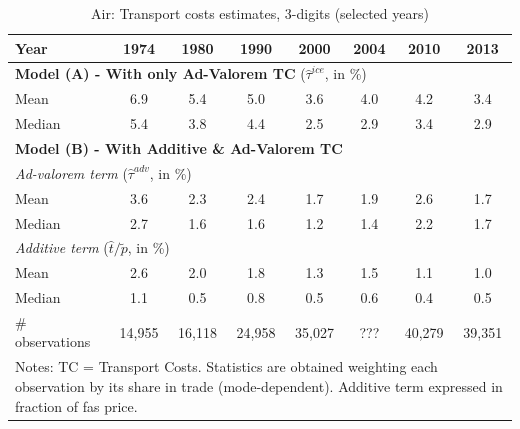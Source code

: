 \documentclass[a4paper,11pt]{article}
\begin{document}
\begin{table}[htbp]
  \centering
  \caption{Air: Transport costs estimates, 3-digits (selected years)}
\begin{center}
    \begin{tabular}{l|ccccccc}
\hline\hline
Year & 1974  & 1980  & 1990  & 2000  & 2004 & 2010  & 2013   \\
\hline
\multicolumn{8}{l}{\textbf{Model (A) - With only Ad-Valorem TC} ($\widehat{\tau}^{ice}$, in \%)}     \\
\hline
Mean  & 6.9& 5.4 &5.0 & 3.6 & 4.0 & 4.2 & 3.4  \\
Median & 5.4 & 3.8 & 4.4 & 2.5 & 2.9 & 3.4 & 2.9  \\
\hline
\multicolumn{8}{l}{\textbf{Model (B) - With Additive \& Ad-Valorem TC}}    \\
\hline
\multicolumn{8}{l}{\textit{Ad-valorem term} ($\widehat{\tau}^{adv}$, in \%)}  \\ \hline
Mean & 3.6 & 2.3 & 2.4 &1.7 & 1.9 & 2.6 & 1.7  \\
Median & 2.7 & 1.6 & 1.6 & 1.2 & 1.4 & 2.2 & 1.7 \\

\hline
\multicolumn{8}{l}{\textit{Additive term} ($\widehat{t}/\widetilde{p}$, in \%)}     \\ \hline
Mean & 2.6 & 2.0 & 1.8 & 1.3 & 1.5 & 1.1 & 1.0  \\
Median & 1.1 & 0.5 & 0.8 & 0.5 & 0.6 & 0.4 & 0.5  \\
\hline
\# observations & 14,955 & 16,118 & 24,958 & 35,027 & ??? & 40,279 & 39,351  \\
\hline\hline
\multicolumn{8}{l}{\parbox[l]{11cm}{ \vspace{7pt}\scriptsize{Notes: TC = Transport Costs. Statistics are obtained weighting each observation by its share in trade (mode-dependent). Additive term expressed in fraction of fas price.}}}
\end{tabular}%
\end{center}
\label{tab:result_air_3d_detail}
\end{table}%
\end{document}
